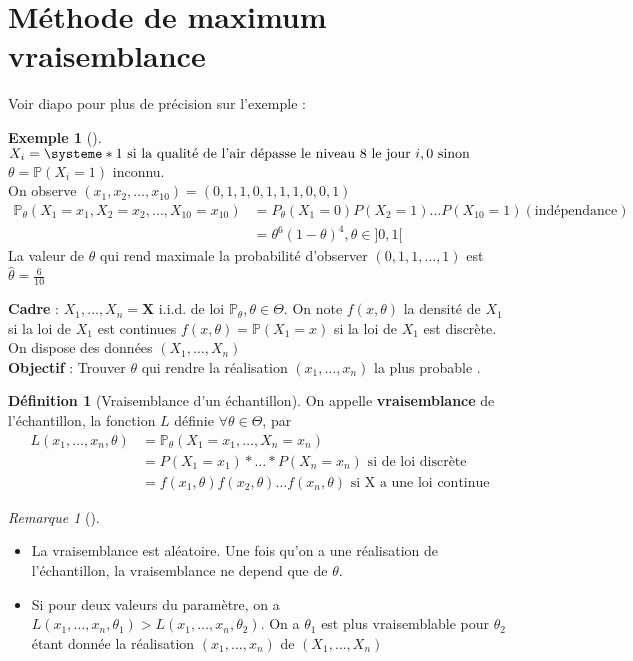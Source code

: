 \documentclass{article}
\theoremstyle{plain}%
\theoremstyle{definition}
\newtheorem{defn}{Définition}[section]
\newtheorem{exmp}{Exemple}[section]
\theoremstyle{remark}
\newtheorem*{rem}{Remarque}
\begin{document}
\section{Méthode de maximum vraisemblance}
Voir diapo pour plus de précision sur l'exemple : 
\begin{exmp}[]
    $ X_i = \systeme*{
        1 \text{ si la qualité de l'air dépasse le niveau 8 le jour } i,
        0 \text{ sinon}
    }$ \\
    $ \theta = \mathbb{P}(X_i = 1) $ inconnu. \\
    On observe $ (x_1,x_2, \dots, x_10) = (0,1,1,0,1,1,1,0,0,1) $ \begin{align*}
        \mathbb{P}_\theta (X_1=x_1, X_2=x_2, \dots, X_10 =x_10) &= P_\theta (X_1=0)P(X_2=1)\dots P(X_10 = 1) (\text{indépendance}) \\ 
        &= \theta ^6 (1-\theta )^4, \theta \in ]0,1[
    \end{align*}
    La valeur de $ \theta  $ qui rend maximale la probabilité d'observer $ (0,1,1,\dots, 1) $ est $ \hat{\theta } = \frac{6}{10} $ 
\end{exmp}
\textbf{Cadre} : $ X_1, \dots, X_n = \mathbf{X}$ i.i.d. de loi $ \mathbb{P}_\theta , \theta \in \Theta  $. On note $ f(x, \theta )  $ la densité de $ X_1 $ si la loi de $ X_1 $ est continues $ f(x, \theta ) = \mathbb{P}(X_1 = x)$ si la loi de $ X_1 $ est discrète. On dispose des données $ (X_1, \dots, X_n) $ \\

\textbf{Objectif} : Trouver $ \theta  $ qui rendre la réalisation $ (x_1,\dots, x_n) $ la plus probable .
\begin{defn}[Vraisemblance d'un échantillon]
    On appelle \textbf{vraisemblance} de l'échantillon, la fonction $ L $ définie $ \forall \theta \in \Theta  $, par 
    \begin{align*}
        L(x_1, \dots, x_n, \theta ) &= \mathbb{P}_\theta (X_1 = x_1, \dots, X_n = x_n) \\
                &= P(X_1=x_1) * \dots * P(X_n = x_n) \text{ si de loi discrète} \\
                &= f(x_1, \theta )f(x_2, \theta )\dots f(x_n, \theta ) \text{ si X a une loi continue}
    \end{align*}
    
\end{defn}
\begin{rem}[]
    \begin{itemize}
        \item La vraisemblance est aléatoire. Une fois qu'on a une réalisation de l'échantillon, la vraisemblance ne depend que de $ \theta  $.
        \item Si pour deux valeurs du paramètre, on a $ L(x_1, \dots, x_n, \theta _1) >  L(x_1, \dots, x_n, \theta _2)$. On a $ \theta _1 $ est plus vraisemblable pour $ \theta _2 $ étant donnée la réalisation $ (x_1, \dots, x_n) $  de $ (X_1, \dots, X_n) $ 
    \end{itemize}
\end{rem}
\end{document}
